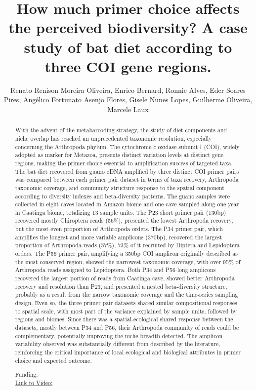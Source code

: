 \documentclass[twoside]{article}
\title{\vspace{-15mm}\fontsize{24pt}{10pt}\selectfont\textbf{ How much primer choice affects the perceived biodiversity? A case study of bat diet according to three COI gene regions. }} %
\author{ Renato Renison Moreira Oliveira,  Enrico Bernard,  Ronnie Alves,  Eder Soares Pires,  Ang\'elico Fortunato Asenjo Flores,  Gisele Nunes Lopes,  Guilherme Oliveira,  Marcele Laux }
\affil{ ITV - Instituto Tecnol\'ogico Vale,  UNIVERSIDADE FEDERAL DE MINAS GERAIS }
\date{}
\begin{document}
  
  
  \maketitle %
  
  
  \thispagestyle{fancy} %
  
  
  \begin{abstract}
  With the advent of the metabarcoding strategy,  the study of diet components and niche overlap has reached an unprecedented taxonomic resolution,  especially concerning the Arthropoda phylum. The cytochrome c oxidase subunit I (COI),  widely adopted as marker for Metazoa,  presents distinct variation levels at distinct gene regions,  making the primer choice essential to amplification success of targeted taxa. The bat diet recovered from guano eDNA amplified by three distinct COI primer pairs was compared between each primer pair dataset in terms of taxa recovery,  Arthropoda taxonomic coverage,  and community structure response to the spatial component according to diversity indexes and beta-diversity patterns. The guano samples were collected in eight caves located in Amazon biome and one cave sampled along one year in Caatinga biome,  totalizing 13 sample units. The P23 short primer pair (130bp) recovered mostly Chiroptera reads (56\%),  presented the lowest Arthropoda recovery,  but the most even proportion of Arthropoda orders. The P34 primer pair,  which amplifies the longest and more variable amplicons (370bp),  recovered the largest proportion of Arthropoda reads (57\%),  73\% of it recruited by Diptera and Lepidoptera orders. The P56 primer pair,  amplifying a 350bp COI amplicon originally described as the most conserved region,  showed the narrowest taxonomic coverage,  with over 95\% of Arthropoda reads assigned to Lepidoptera. Both P34 and P56 long amplicons recovered the largest portion of reads from Caatinga cave,  showed better Arthropoda recovery and resolution than P23,  and presented a nested beta-diversity structure,  probably as a result from the narrow taxonomic coverage and the time-series sampling design. Even so,  the three primer pair datasets shared similar compositional responses to spatial scale,  with most part of the variance explained by sample units,  followed by regions and biomes. Since there was a spatial-ecological shared response between the datasets,  mostly between P34 and P56,  their Arthropoda community of reads could be complementary,  potentially improving the niche breadth detected. The amplicon variability observed was substantially different from described by the literature,  reinforcing the critical importance of local ecological and biological attributes in primer choice and expected outcome.
  
  Funding:   \\
  \href{http://ab3c.org.br/xpress_pres2020/xmxp2020-303108.html}{Link to Video:}

  \end{abstract}
   
  
\end{document}
